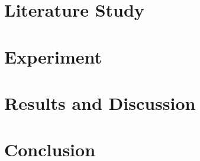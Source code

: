 \documentclass[a4paper,10pt,twoside]{report}
\begin{document}

\chapter{Literature Study}\label{chapter:preliminaries}



\chapter{Experiment}\label{chapter:experiment}


\chapter{Results and Discussion}\label{chapter:analysis}


\chapter{Conclusion}\label{chapter:conclusions}



%


%


%




\appendix
{}

\end{document}
